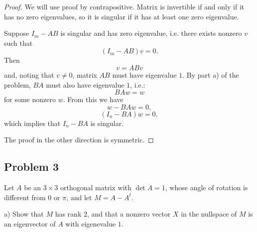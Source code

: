 \documentclass{article}
\theoremstyle{definition}
\begin{document}
\begin{proof}

We will use proof by contrapositive.
Matrix is invertible if and only if it has no zero eigenvalues, so it is singular if it has at least one zero eigenvalue.

Suppose $I_m - AB$ is singular and has zero eigenvalue, i.e. there exists nonzero $v$ such that
\[ (I_m - AB)v = 0. \]
Then
\[ v = AB v \]
and, noting that $v \neq 0$, matrix $AB$ must have eigenvalue $1$.
By part a) of the problem, $BA$ must also have eigenvalue $1$, i.e.:
\[ BA w = w \]
for some nonzero $w$.
From this we have
\[ w - BA w = 0, \]
\[ (I_n - BA) w = 0, \]
which implies that $I_n - BA$ is singular.

The proof in the other direction is symmetric.

\end{proof}


\subsection*{Problem 3}

\begin{tcolorbox}
Let $A$ be an $3 \times 3$ orthogonal matrix with $\det A = 1$, whose angle of rotation is different from $0$ or $\pi$, and let $M = A - A^t$.

a) Show that $M$ has rank $2$, and that a nonzero vector $X$ in the nullspace of $M$ is an eigenvector of $A$ with eigenevalue $1$.
\end{tcolorbox}
\end{document}
